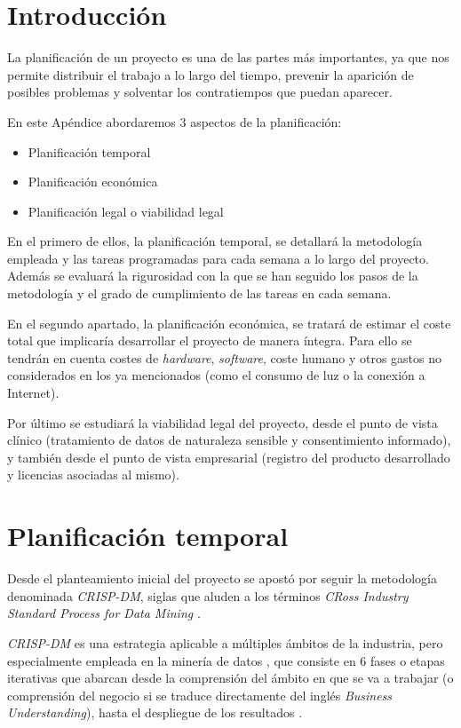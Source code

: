 
\section{Introducción}

La planificación de un proyecto es una de las partes más importantes, ya que nos permite distribuir el trabajo a lo largo del tiempo, prevenir la aparición de posibles problemas y solventar los contratiempos que puedan aparecer.

En este Apéndice abordaremos 3 aspectos de la planificación:
\begin{itemize}[itemsep=0.1em]
    \item Planificación temporal
    \item Planificación económica 
    \item Planificación legal o viabilidad legal
\end{itemize}

En el primero de ellos, la planificación temporal, se detallará la metodología empleada y las tareas programadas para cada semana a lo largo del proyecto. Además se evaluará la rigurosidad con la que se han seguido los pasos de la metodología y el grado de cumplimiento de las tareas en cada semana.

En el segundo apartado, la planificación económica, se tratará de estimar el coste total que implicaría desarrollar el proyecto de manera íntegra. Para ello se tendrán en cuenta costes de \textit{hardware}, \textit{software}, coste humano y otros gastos no considerados en los ya mencionados (como el consumo de luz o la conexión a Internet).

Por último se estudiará la viabilidad legal del proyecto, desde el punto de vista clínico (tratamiento de datos de naturaleza sensible y consentimiento informado), y también desde el punto de vista empresarial (registro del producto desarrollado y licencias asociadas al mismo).

\section{Planificación temporal}

Desde el planteamiento inicial del proyecto se apostó por seguir la metodología denominada \textit{CRISP-DM}, siglas que aluden a los términos \textit{CRoss Industry Standard Process for Data Mining} \cite{crispdm:schorer}. 

\textit{CRISP-DM} es una estrategia aplicable a múltiples ámbitos de la industria, pero especialmente empleada en la minería de datos \cite{crispdm:azevedo}, que consiste en 6 fases o etapas iterativas que abarcan desde la comprensión del ámbito en que se va a trabajar (o comprensión del negocio si se traduce directamente del inglés \textit{Business Understanding}), hasta el despliegue de los resultados \cite{crispdm:niaksu,crispdm:schorer}.

